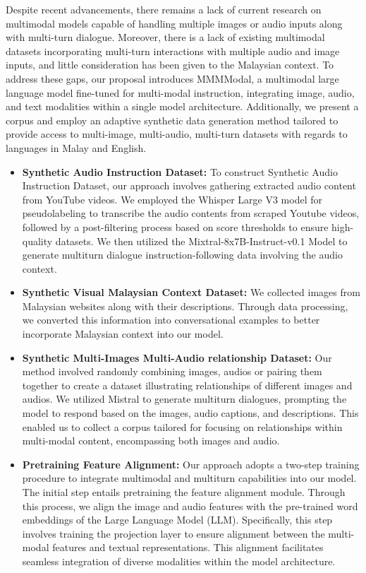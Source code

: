 \documentclass[preprint]{article}
\begin{document}
Despite recent advancements, there remains a lack of current research on multimodal models capable of handling multiple images or audio inputs along with multi-turn dialogue. Moreover, there is a lack of existing multimodal datasets incorporating multi-turn interactions with multiple audio and image inputs, and little consideration has been given to the Malaysian context. To address these gaps, our proposal introduces MMMModal, a multimodal large language model fine-tuned for multi-modal instruction, integrating image, audio, and text modalities within a single model architecture. Additionally, we present a corpus and employ an adaptive synthetic data generation method tailored to provide access to multi-image, multi-audio, multi-turn datasets with regards to languages in Malay and English.

\begin{itemize}

  \item \textbf{Synthetic Audio Instruction Dataset:} To construct Synthetic Audio Instruction Dataset, our approach involves gathering extracted audio content from YouTube videos. We  employed the Whisper Large V3 model for pseudolabeling to transcribe the audio contents from scraped Youtube videos, followed by a post-filtering process based on score thresholds to ensure high-quality datasets. We then utilized the Mixtral-8x7B-Instruct-v0.1 Model to generate multiturn dialogue instruction-following data involving the audio context.

  \item \textbf{Synthetic Visual Malaysian Context Dataset:}  We collected images from Malaysian websites along with their descriptions. Through data processing, we converted this information into conversational examples to better incorporate Malaysian context into our model.

  \item \textbf{Synthetic Multi-Images Multi-Audio relationship Dataset:} Our method involved randomly combining images, audios or pairing them together to create a dataset illustrating relationships of different images and audios. We utilized Mistral to generate multiturn dialogues, prompting the model to respond based on the images, audio captions, and descriptions. This enabled us to collect a corpus tailored for focusing on relationships within multi-modal content, encompassing both images and audio.

  \item \textbf{Pretraining Feature Alignment:} Our approach adopts a two-step training procedure to integrate multimodal and multiturn capabilities into our model. The initial step entails pretraining the feature alignment module. Through this process, we align the image and audio features with the pre-trained word embeddings of the Large Language Model (LLM). Specifically, this step involves training the projection layer to ensure alignment between the multi-modal features and textual representations. This alignment facilitates seamless integration of diverse modalities within the model architecture.


\end{itemize}
\end{document}
